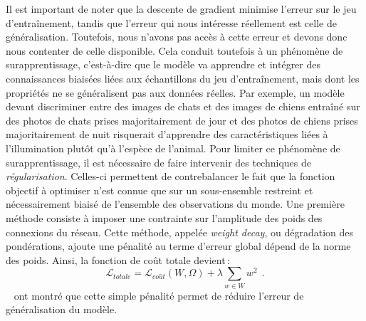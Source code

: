 Il est important de noter que la descente de gradient minimise l'erreur sur le jeu d'entraînement, tandis que l'erreur qui nous intéresse réellement est celle de généralisation. Toutefois, nous n'avons pas accès à cette erreur et devons donc nous contenter de celle disponible. Cela conduit toutefois à un phénomène de surapprentissage, c'est-à-dire que le modèle va apprendre et intégrer des connaissances biaisées liées aux échantillons du jeu d'entraînement, mais dont les propriétés ne se généralisent pas aux données réelles. Par exemple, un modèle devant discriminer entre des images de chats et des images de chiens entraîné sur des photos de chats prises majoritairement de jour et des photos de chiens prises majoritairement de nuit risquerait d'apprendre des caractéristiques liées à l'illumination plutôt qu'à l'espèce de l'animal.
Pour limiter ce phénomène de surapprentissage, il est nécessaire de faire intervenir des techniques de \emph{régularisation}. Celles-ci permettent de contrebalancer le fait que la fonction objectif à optimiser n'est connue que sur un sous-ensemble restreint et nécessairement biaisé de l'ensemble des observations du monde. Une première méthode consiste à imposer une contrainte sur l'amplitude des poids des connexions du réseau. Cette méthode, appelée \emph{weight decay}, ou dégradation des pondérations, ajoute une pénalité au terme d'erreur global dépend de la norme des poids. Ainsi, la fonction de coût totale devient\,:
$$\mathcal{L}_{totale} = \mathcal{L}_{co\hat{u}t}(W, \Omega) + \lambda \sum_{w \in W} w^2~~.$$
~\citet{krogh_simple_1991} ont montré que cette simple pénalité permet de réduire l'erreur de généralisation du modèle.

